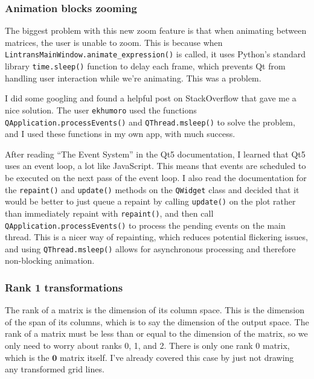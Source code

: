 \documentclass[../main.tex]{subfiles}
\begin{document}
\subsubsection{Animation blocks zooming\label{development:improving-the-gui:animation-blocks-zooming}}

The biggest problem with this new zoom feature is that when animating between matrices, the user is unable to zoom. This is because when \texttt{LintransMainWindow.animate\_expression()} is called, it uses Python's standard library \texttt{time.sleep()} function to delay each frame, which prevents Qt from handling user interaction while we're animating. This was a problem.

I did some googling and found a helpful post on StackOverflow\cite{so-update-window-in-pyqt5} that gave me a nice solution. The user \texttt{ekhumoro} used the functions \texttt{QApplication.processEvents()} and \texttt{QThread.msleep()} to solve the problem, and I used these functions in my own app, with much success.

After reading \enquote{The Event System} in the Qt5 documentation\cite{qt5-docs-event-system}, I learned that Qt5 uses an event loop, a lot like JavaScript. This means that events are scheduled to be executed on the next pass of the event loop. I also read the documentation for the \texttt{repaint()} and \texttt{update()} methods on the \texttt{QWidget} class\cite{qt5-docs-qwidget-repaint,qt5-docs-qwidget-update} and decided that it would be better to just queue a repaint by calling \texttt{update()} on the plot rather than immediately repaint with \texttt{repaint()}, and then call \texttt{QApplication.processEvents()} to process the pending events on the main thread. This is a nicer way of repainting, which reduces potential flickering issues, and using \texttt{QThread.msleep()} allows for asynchronous processing and therefore non-blocking animation.

\subsubsection{Rank 1 transformations\label{development:improving-the-gui:rank-1-transformations}}

The rank of a matrix is the dimension of its column space. This is the dimension of the span of its columns, which is to say the dimension of the output space. The rank of a matrix must be less than or equal to the dimension of the matrix, so we only need to worry about ranks 0, 1, and 2. There is only one rank 0 matrix, which is the $\mathbf{0}$ matrix itself. I've already covered this case by just not drawing any transformed grid lines.
\end{document}
